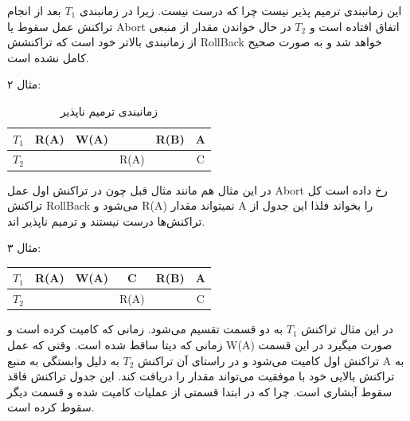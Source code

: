 \documentclass[a4paper]{article}
\begin{document}
این زمانبندی ترمیم پذیر نیست چرا که درست نیست. زیرا در زمانبندی $T_{1}$ بعد از
انجام تراکنش عمل سقوط یا Abort اتفاق افتاده است و $T_{2}$ در حال خواندن مقدار از
منبعی از زمانبندی بالاتر خود است که تراکنشش RollBack خواهد شد و به صورت صحیح
کامل نشده است.

\newpage

مثال ۲: 

\begin{LTR}
    \begin{table}[h]
        \centering
        \begin{RTL}
            \caption{زمانبندی ترمیم ناپذیر}
        \end{RTL}
        \begin{tabular}{c|c|c|c|c|c}
            $T_{1}$ & R(A) & W(A) & & R(B) & A \\ \hline
            $T_{2}$ & & & R(A) & & C \\
        \end{tabular}
    \end{table}
\end{LTR}

در این مثال هم مانند مثال قبل چون در تراکنش اول عمل Abort رخ داده است کل تراکنش
RollBack می‌شود و R(A) نمیتواند مقدار A را بخواند فلذا این جدول از تراکنش‌ها
درست نیستند و ترمیم ناپذیر اند.

مثال ۳:

\begin{LTR}
    \begin{table}[h]
        \centering
        \begin{tabular}{c|c|c|c|c|c}
            $T_{1}$ & R(A) & W(A) & C & R(B) & A \\ \hline
            $T_{2}$ & & & R(A) & & C \\
        \end{tabular}
    \end{table}
\end{LTR}

در این مثال تراکنش $T_{1}$ به دو قسمت تقسیم می‌شود. زمانی که کامیت کرده است و
زمانی که دیتا ساقط شده است. وقتی که عمل W(A) صورت میگیرد در این قسمت تراکنش اول
کامیت می‌شود و در راستای آن تراکنش $T_{2}$ به دلیل وابستگی به منبع A به تراکنش
بالایی خود با موفقیت می‌تواند مقدار را دریافت کند. این جدول تراکنش فاقد سقوط
آبشاری است. چرا که در ابتدا قسمتی از عملیات کامیت شده و قسمت دیگر سقوط کرده است.

\section{}
\end{document}
